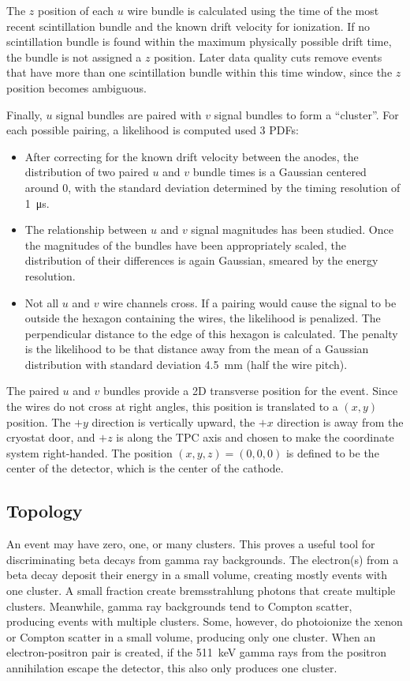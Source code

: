 \documentclass[herrin-thesis.tex]{subfiles}
\begin{document}
The \(z\) position of each \(u\) wire bundle is calculated using the time of the most recent scintillation bundle and the known drift velocity for ionization. If no scintillation bundle is found within the maximum physically possible drift time, the bundle is not assigned a \(z\) position. Later data quality cuts remove events that have more than one scintillation bundle within this time window, since the \(z\) position becomes ambiguous.

Finally, \(u\) signal bundles are paired with \(v\) signal bundles to form a ``cluster''. For each possible pairing, a likelihood is computed used 3 PDFs:
\begin{itemize}
\item After correcting for the known drift velocity between the anodes, the distribution of two paired \(u\) and \(v\) bundle times is a Gaussian centered around 0, with the standard deviation determined by the timing resolution of \SI{1}{\micro\s}.
\item The relationship between \(u\) and \(v\) signal magnitudes has been studied. Once the magnitudes of the bundles have been appropriately scaled, the distribution of their differences is again Gaussian, smeared by the energy resolution.
\item Not all \(u\) and \(v\) wire channels cross. If a pairing would cause the signal to be outside the hexagon containing the wires, the likelihood is penalized. The perpendicular distance to the edge of this hexagon is calculated. The penalty is the likelihood to be that distance away from the mean of a Gaussian distribution with standard deviation \SI{4.5}{\mm} (half the wire pitch).
\end{itemize}

The paired \(u\) and \(v\) bundles provide a 2D transverse position for the event. Since the wires do not cross at right angles, this position is translated to a \((x, y)\) position. The \(+y\) direction is vertically upward, the \(+x\) direction is away from the cryostat door, and \(+z\) is along the TPC axis and chosen to make the coordinate system right-handed. The position \((x, y, z) = (0, 0, 0)\) is defined to be the center of the detector, which is the center of the cathode.

\subsection{Topology}
An event may have zero, one, or many clusters. This proves a useful tool for discriminating beta decays from gamma ray backgrounds. The electron(s) from a beta decay deposit their energy in a small volume, creating mostly events with one cluster. A small fraction create bremsstrahlung photons that create multiple clusters. Meanwhile, gamma ray backgrounds tend to Compton scatter, producing events with multiple clusters. Some, however, do photoionize the xenon or Compton scatter in a small volume, producing only one cluster. When an electron-positron pair is created, if the \SI{511}{\keV} gamma rays from the positron annihilation escape the detector, this also only produces one cluster.
\end{document}

